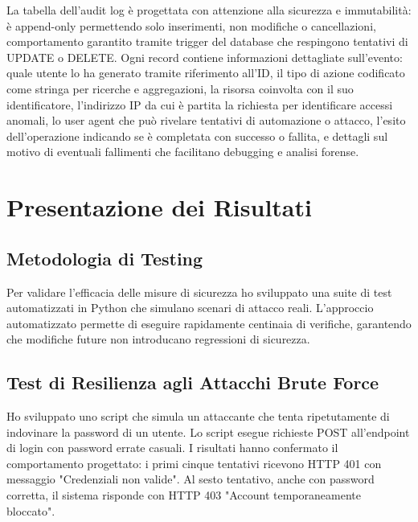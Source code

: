 \documentclass[12pt, a4paper]{article}
\begin{document}
La tabella dell'audit log è progettata con attenzione alla sicurezza e immutabilità: è append-only permettendo solo inserimenti, non modifiche o cancellazioni, comportamento garantito tramite trigger del database che respingono tentativi di UPDATE o DELETE. Ogni record contiene informazioni dettagliate sull'evento: quale utente lo ha generato tramite riferimento all'ID, il tipo di azione codificato come stringa per ricerche e aggregazioni, la risorsa coinvolta con il suo identificatore, l'indirizzo IP da cui è partita la richiesta per identificare accessi anomali, lo user agent che può rivelare tentativi di automazione o attacco, l'esito dell'operazione indicando se è completata con successo o fallita, e dettagli sul motivo di eventuali fallimenti che facilitano debugging e analisi forense.

\newpage





\section{Presentazione dei Risultati}

\subsection{Metodologia di Testing}

Per validare l'efficacia delle misure di sicurezza ho sviluppato una suite di test automatizzati in Python che simulano scenari di attacco reali. L'approccio automatizzato permette di eseguire rapidamente centinaia di verifiche, garantendo che modifiche future non introducano regressioni di sicurezza.

\subsection{Test di Resilienza agli Attacchi Brute Force}

Ho sviluppato uno script che simula un attaccante che tenta ripetutamente di indovinare la password di un utente. Lo script esegue richieste POST all'endpoint di login con password errate casuali. I risultati hanno confermato il comportamento progettato: i primi cinque tentativi ricevono HTTP 401 con messaggio "Credenziali non valide". Al sesto tentativo, anche con password corretta, il sistema risponde con HTTP 403 "Account temporaneamente bloccato".
\end{document}

